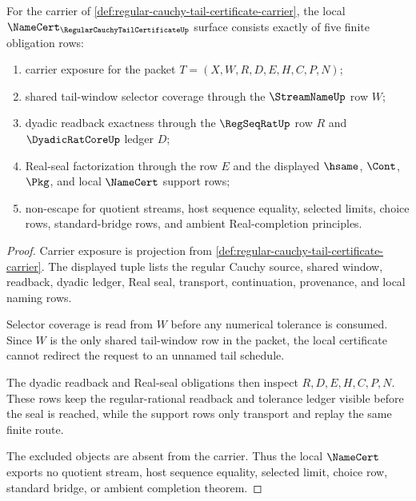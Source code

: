\begin{theorem}
\label{thm:regular-cauchy-tail-certificate-namecert-obligations}
For the carrier of \autoref{def:regular-cauchy-tail-certificate-carrier}, the local $\NameCert_{\RegularCauchyTailCertificateUp}$ surface consists exactly of five finite obligation rows:
\begin{enumerate}
\item carrier exposure for the packet $T=(X,W,R,D,E,H,C,P,N)$;
\item shared tail-window selector coverage through the $\StreamNameUp$ row $W$;
\item dyadic readback exactness through the $\RegSeqRatUp$ row $R$ and $\DyadicRatCoreUp$ ledger $D$;
\item Real-seal factorization through the row $E$ and the displayed $\hsame$, $\Cont$, $\Pkg$, and local $\NameCert$ support rows;
\item non-escape for quotient streams, host sequence equality, selected limits, choice rows, standard-bridge rows, and ambient Real-completion principles.
\end{enumerate}
\end{theorem}
\begin{proof}
Carrier exposure is projection from \autoref{def:regular-cauchy-tail-certificate-carrier}. The displayed tuple lists the regular Cauchy source, shared window, readback, dyadic ledger, Real seal, transport, continuation, provenance, and local naming rows.

Selector coverage is read from $W$ before any numerical tolerance is consumed. Since $W$ is the only shared tail-window row in the packet, the local certificate cannot redirect the request to an unnamed tail schedule.

The dyadic readback and Real-seal obligations then inspect $R,D,E,H,C,P,N$. These rows keep the regular-rational readback and tolerance ledger visible before the seal is reached, while the support rows only transport and replay the same finite route.

The excluded objects are absent from the carrier. Thus the local $\NameCert$ exports no quotient stream, host sequence equality, selected limit, choice row, standard bridge, or ambient completion theorem.
\end{proof}

